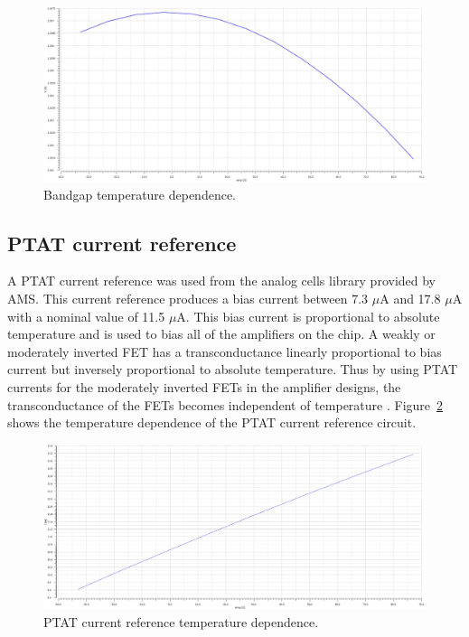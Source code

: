\documentclass[12pt,oneside,final]{siuethesis}
\theoremstyle{definition}
\begin{document}
\begin{figure}[htbp!]
\centering
\includegraphics[scale=.3,keepaspectratio=true]{../data/bandgap_temp.png} 
\caption{Bandgap temperature dependence.}
\label{fig:bandgap}
\end{figure}

\subsection{PTAT current reference}
\par A PTAT current reference was used from the analog cells library provided by AMS. This current reference produces a bias current between 7.3 $\mu$A and 17.8 $\mu$A with a nominal value of 11.5 $\mu$A. This bias current is proportional to absolute temperature and is used to bias all of the amplifiers on the chip. A weakly or moderately inverted FET has a transconductance linearly proportional to bias current but inversely proportional to absolute temperature. Thus by using PTAT currents for the moderately inverted FETs in the amplifier designs, the transconductance of the FETs becomes independent of temperature \cite{ALLEN}. Figure~\ref{fig:ptat} shows the temperature dependence of the PTAT current reference circuit.

\begin{figure}[htbp!]
\centering
\includegraphics[scale=.3,keepaspectratio=true]{../data/ptat.png} 
\caption{PTAT current reference temperature dependence.}
\label{fig:ptat}
\end{figure}
\end{document}
